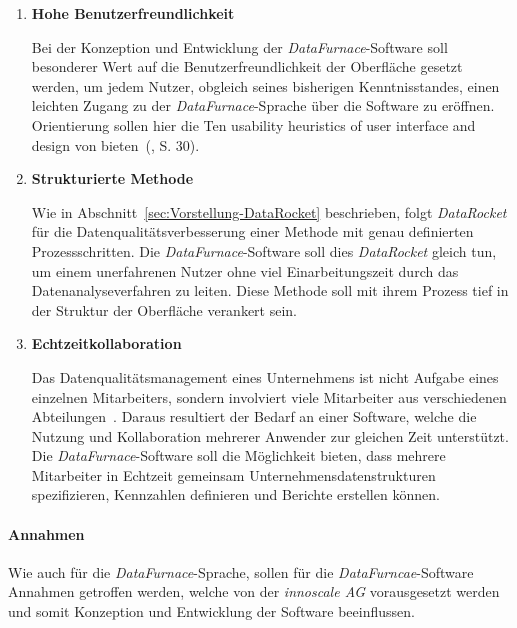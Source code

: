 \documentclass[
  language=german, %
  type=bachelor%
]{isthesis}
\begin{document}
\begin{content}
\begin{enumerate}
    \item \textbf{Hohe Benutzerfreundlichkeit}

      Bei der Konzeption und Entwicklung der \textit{DataFurnace}-Software soll
      besonderer Wert auf die Benutzerfreundlichkeit der Oberfläche gesetzt
      werden, um jedem Nutzer, obgleich seines bisherigen Kenntnisstandes,  einen
      leichten Zugang zu der \textit{DataFurnace}-Sprache über die Software zu
      eröffnen. Orientierung sollen hier die \glqq{}Ten usability heuristics of
      user interface and design\grqq{} von
      \textsc{\citeauthor{nielsen1994heuristic}}
      bieten~(\citeyear{nielsen1994heuristic}, S. 30).

    \item \textbf{Strukturierte Methode}

      Wie in Abschnitt~\ref{sec:Vorstellung-DataRocket} beschrieben, folgt
      \textit{DataRocket} für die Datenqualitätsverbesserung einer Methode mit
      genau definierten Prozessschritten. Die \textit{DataFurnace}-Software
      soll dies \textit{DataRocket} gleich tun, um einem unerfahrenen Nutzer
      ohne viel Einarbeitungszeit durch das Datenanalyseverfahren zu leiten.
      Diese Methode soll mit ihrem Prozess tief in der Struktur der Oberfläche
      verankert sein.

    \item \textbf{Echtzeitkollaboration}

			Das Datenqualitätsmanagement eines Unternehmens ist nicht Aufgabe eines
			einzelnen Mitarbeiters, sondern involviert viele Mitarbeiter aus
			verschiedenen Abteilungen~\cite[][S. 2]{geiger2004data}. Daraus resultiert der
			Bedarf an einer Software, welche die Nutzung und Kollaboration mehrerer
			Anwender zur gleichen Zeit unterstützt. Die \textit{DataFurnace}-Software
			soll die Möglichkeit bieten, dass mehrere Mitarbeiter in Echtzeit gemeinsam
			Unternehmensdatenstrukturen spezifizieren, Kennzahlen
			definieren und Berichte erstellen können.
      
  \end{enumerate}


	\paragraph{Annahmen} Wie auch für die \textit{DataFurnace}-Sprache, sollen
	für die \textit{DataFurncae}-Software Annahmen getroffen werden, welche von der
	\textit{innoscale AG} vorausgesetzt werden und somit Konzeption und
	Entwicklung der Software beeinflussen.


\end{content}
\end{document}
